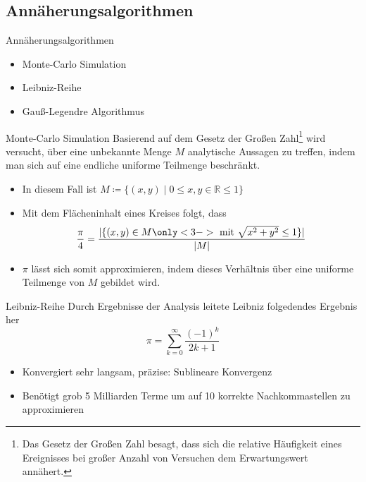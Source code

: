 \documentclass[9pt, t]{beamer}
\begin{document}
\subsection{Annäherungsalgorithmen}

\begin{frame}{Annäherungsalgorithmen}
    \begin{itemize}
        \item Monte-Carlo Simulation
        \item Leibniz-Reihe
        \item Gauß-Legendre Algorithmus
    \end{itemize}
\end{frame}

\begin{frame}{Monte-Carlo Simulation}
    Basierend auf dem Gesetz der Großen Zahl\footnote{Das Gesetz der Großen Zahl
        besagt, dass sich die relative Häufigkeit eines Ereignisses bei großer Anzahl
        von Versuchen dem Erwartungswert annähert.
    } wird versucht, über eine unbekannte Menge \(M\) analytische Aussagen zu treffen,
    indem man sich auf eine endliche uniforme Teilmenge beschränkt.
    \begin{itemize}
        \item<1-> In diesem Fall ist \(M \coloneq \{(x, y) \mid 0 \le x,y \in \mathbb{R} \le 1\}\)
        \item<2-> Mit dem Flächeninhalt eines Kreises folgt, dass
              \begin{equation*}
                  \frac{\pi}{4} = \frac{
                      |\{(x,y) \in M \only<3->{\text{\ mit } \sqrt{x^2 + y^2} \le 1} \}|
                  }{|M|}
              \end{equation*}
        \item<4-> \(\pi\) lässt sich somit approximieren, indem dieses Verhältnis über eine uniforme Teilmenge von \(M\) gebildet wird.
    \end{itemize}
\end{frame}

\begin{frame}{Leibniz-Reihe}
    Durch Ergebnisse der Analysis leitete Leibniz folgedendes Ergebnis her \cite{Leibniz}
    \[ \pi = \sum_{k=0}^{\infty} \frac{(-1)^k}{2k+1} \]
    \begin{itemize}
        \item<3-> Konvergiert sehr langsam, präzise: Sublineare Konvergenz \\
        \item<3-> Benötigt grob 5 Milliarden Terme um auf 10 korrekte Nachkommastellen zu approximieren
    \end{itemize}
\end{frame}
\end{document}

